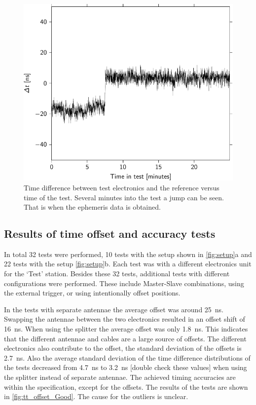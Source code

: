 \begin{figure}
    \centering
    \includegraphics{plots/cluster/tt_delta_time_074}
    \caption{Time difference between test electronics and the reference versus time of the test. Several minutes into the test a jump can be seen. That is when the ephemeris data is obtained.}
    \label{fig:tt_delta_time_074}
\end{figure}


\subsection{Results of time offset and accuracy tests}
\label{sub:gps_offsets}

In total 32 tests were performed, 10 tests with the setup shown in \cref{fig:setup}a and 22 tests with the setup \cref{fig:setup}b. Each test was with a different \hisparc electronics unit for the `Test' station. Besides these 32 tests, additional tests with different configurations were performed. These include Master-Slave combinations, using the external trigger, or using intentionally offset \gps positions.

In the tests with separate \gps antennae the average offset was around \SI{25}{\ns}. Swapping the \gps antennae between the two electronics resulted in an offset shift of \SI{16}{\ns}. When using the splitter the average offset was only \SI{1.8}{\ns}. This indicates that the different \gps antennae and cables are a large source of offsets. The different \hisparc electronics also contribute to the offset, the standard deviation of the offsets is \SI{2.7}{\ns}. Also the average standard deviation of the time difference distributions of the tests decreased from \SI{4.7}{\ns} to \SI{3.2}{\ns} [double check these values] when using the splitter instead of separate antennae. The achieved timing accuracies are within the specification, except for the offsets. The results of the tests are shown in \cref{fig:tt_offset_Good}. The cause for the outliers is unclear.

